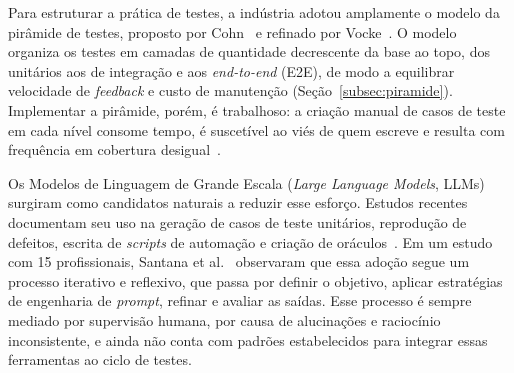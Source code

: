 \documentclass[12pt]{article}
\begin{document}
Para estruturar a prática de testes, a indústria adotou amplamente o modelo
da pirâmide de testes, proposto por Cohn~\cite{cohn2009} e refinado por
Vocke~\cite{vocke2018}. O modelo organiza os testes em camadas de quantidade
decrescente da base ao topo, dos unitários aos de integração e aos
\textit{end-to-end} (E2E), de modo a equilibrar velocidade de
\textit{feedback} e custo de manutenção (Seção~\ref{subsec:piramide}).
Implementar a pirâmide, porém, é trabalhoso: a criação manual de casos de
teste em cada nível consome tempo, é suscetível ao viés de quem escreve e
resulta com frequência em cobertura desigual~\cite{cohn2009}.

Os Modelos de Linguagem de Grande Escala (\textit{Large Language Models},
LLMs) surgiram como candidatos naturais a reduzir esse esforço. Estudos
recentes documentam seu uso na geração de casos de teste unitários,
reprodução de defeitos, escrita de \textit{scripts} de automação e criação de
oráculos~\cite{wang2024survey,santana2025software}. Em um estudo com 15
profissionais, Santana et al.~\cite{santana2025software} observaram que essa
adoção segue um processo iterativo e reflexivo, que passa por definir o
objetivo, aplicar estratégias de engenharia de \textit{prompt}, refinar e
avaliar as saídas. Esse processo é sempre mediado por supervisão humana, por
causa de alucinações e raciocínio inconsistente, e ainda não conta com
padrões estabelecidos para integrar essas ferramentas ao ciclo de testes.
\end{document}
